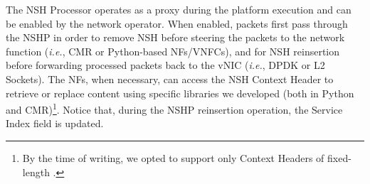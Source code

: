 The NSH Processor operates as a proxy during the platform execution and can be enabled by the network operator. When enabled, packets first pass through the NSHP in order to remove NSH before steering the packets to the network function (\textit{i.e.}, CMR or Python-based NFs/VNFCs), and for NSH reinsertion before forwarding processed packets back to the vNIC (\textit{i.e.}, DPDK or L2 Sockets). The NFs, when necessary, can access the NSH Context Header to retrieve or replace content using specific libraries we developed (both in Python and CMR)\footnote{By the time of writing, we opted to support only Context Headers of fixed-length \cite{Quinn-2018}.}. Notice that, during the NSHP reinsertion operation, the Service Index field is updated.





